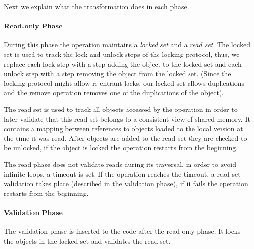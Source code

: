 Next we explain what the transformation does in each phase. 

\paragraph{Read-only Phase} 
  During this phase the operation maintains a \emph{locked set}
  and a \emph{read set}. 
  The locked set is used to track the lock and unlock steps
  of the locking protocol, thus, we replace each lock step 
  with a step adding the object to the locked set and each
  unlock step with a step removing the object from the locked
  set. (Since the locking protocol might allow re-entrant locks, 
  our locked set allows duplications and the remove operation
  removes one of the duplications of the object).  
  
The read set is used to track all objects accessed by the 
operation in order to later validate that this read set
belongs to a consistent view of shared memory.  
It contains a mapping between references to objects loaded 
to the local version at the time it was read. After 
objects are added to the read set they are checked to be 
unlocked, if the object is locked the operation restarts
from the beginning. 


 
The read phase does not validate reads during its traversal, 
in order to avoid infinite loops, a timeout is set. 
If the operation reaches the timeout, a read set 
validation takes place (described in the validation phase), 
if it fails the operation restarts from the beginning.
  

\paragraph{Validation Phase} 
The validation phase is inserted to the code after
the read-only phase. It locks the objects in the locked set
and validates the read set. 

